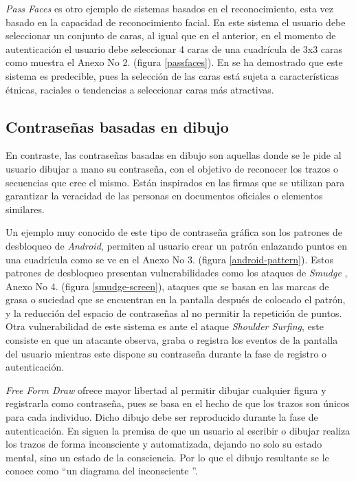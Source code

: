 \textit{Pass Faces} \cite{Tuscano2015GraphicalPA,inproceedings} es otro ejemplo de sistemas basados en el reconocimiento, esta vez basado en la capacidad de reconocimiento facial. En este sistema el usuario debe seleccionar un conjunto de caras, al igual que en el anterior, en el momento de autenticación el usuario debe seleccionar 4 caras de una cuadrícula de 3x3 caras como muestra el Anexo No 2. (figura \ref{passfaces}). En \cite{Tuscano2015GraphicalPA} se ha demostrado que este sistema es predecible, pues la selección de las caras está sujeta a características étnicas, raciales o tendencias a seleccionar caras más atractivas.

\subsection{Contraseñas basadas en dibujo}
En contraste, las contraseñas basadas en dibujo son aquellas donde se le pide al usuario dibujar a mano su contraseña, con el objetivo de reconocer los trazos o secuencias que cree el mismo. Están inspirados en las firmas que se utilizan para garantizar la veracidad de las personas en documentos oficiales o elementos similares. 

Un ejemplo muy conocido de este tipo de contraseña gráfica son los patrones de desbloqueo de \textit{Android}, permiten al usuario crear un patrón enlazando puntos en una cuadrícula como se ve en el Anexo No 3. (figura \ref{android-pattern}). Estos patrones de desbloqueo presentan vulnerabilidades como los ataques de \emph{Smudge} \cite{aviv2010smudge}, Anexo No 4. (figura \ref{smudge-screen}), ataques que se basan en las marcas de grasa o suciedad que se encuentran en la pantalla despu\'es de colocado el patr\'on, y la reducción del espacio de contraseñas al no permitir la repetición de puntos. Otra vulnerabilidad de este sistema  es ante el ataque \emph{Shoulder Surfing}, este consiste en que un atacante observa, graba o registra los eventos de la pantalla del usuario mientras este dispone su contraseña durante la fase de registro o autenticación.






\textit{Free Form Draw} \cite{lin2009free} ofrece mayor libertad al permitir dibujar cualquier figura y registrarla como contraseña, pues se basa en el hecho de que los trazos son únicos para cada individuo. Dicho dibujo debe ser reproducido durante la fase de autenticación. En \cite{lin2009free} siguen la premisa de que un usuario al escribir o dibujar realiza los trazos de forma inconsciente y automatizada, dejando no solo su estado mental, sino un estado de la consciencia. Por lo que el dibujo resultante se le conoce como ``un diagrama del inconsciente ''.

